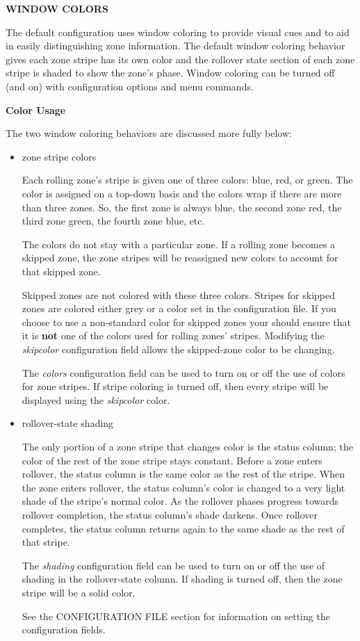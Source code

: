 {\bf WINDOW COLORS}

The default  configuration uses window coloring to provide
visual cues and to aid in easily distinguishing zone information.  The default
window coloring behavior gives each zone stripe has its own color and the
rollover state section of each zone stripe is shaded to show the zone's phase.
Window coloring can be turned off (and on) with configuration options and menu
commands.

{\bf Color Usage}

The two window coloring behaviors are discussed more fully below:

\begin{itemize}

\item zone stripe colors\verb" "

Each rolling zone's stripe is given one of three colors:  blue, red, or green.
The color is assigned on a top-down basis and the colors wrap if there are
more than three zones.  So, the first zone is always blue, the second zone
red, the third zone green, the fourth zone blue, etc.

The colors do not stay with a particular zone.  If a rolling zone becomes a
skipped zone, the zone stripes will be reassigned new colors to account for
that skipped zone.

Skipped zones are not colored with these three colors.  Stripes for skipped
zones are colored either grey or a color set in the configuration file.  If
you choose to use a non-standard color for skipped zones your should ensure
that it is {\bf not} one of the colors used for rolling zones' stripes.
Modifying the {\it skipcolor} configuration field allows the skipped-zone color
to be changing.

The {\it colors} configuration field can be used to turn on or off the use of
colors for zone stripes.  If stripe coloring is turned off, then every stripe
will be displayed using the {\it skipcolor} color.

\item rollover-state shading\verb" "

The only portion of a zone stripe that changes color is the status column; the
color of the rest of the zone stripe stays constant.  Before a zone enters
rollover, the status column is the same color as the rest of the stripe.  When
the zone enters rollover, the status column's color is changed to a very light
shade of the stripe's normal color.  As the rollover phases progress towards
rollover completion, the status column's shade darkens.  Once rollover
completes, the status column returns again to the same shade as the rest of
that stripe.

The {\it shading} configuration field can be used to turn on or off the use of
shading in the rollover-state column.  If shading is turned off, then the zone
stripe will be a solid color.

See the CONFIGURATION FILE section for information on setting the
configuration fields.

\end{itemize}

